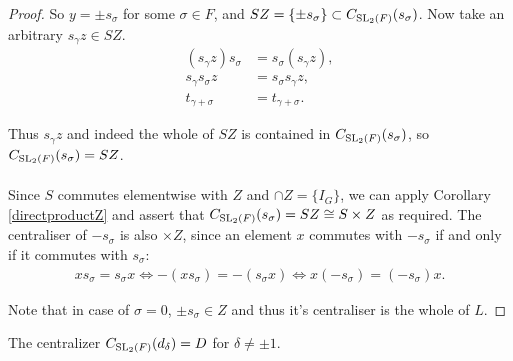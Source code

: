 \begin{proof}
    So $y = \pm s_\sigma$ for some $\sigma \in F$, and $SZ = \{ \pm s_\sigma \} \subset C_{\operatorname{SL}_2(F)}(s_\sigma)$. Now take an arbitrary $s_\gamma z \in SZ$.
    \begin{align*} (s_\gamma z) s_\sigma &= s_\sigma (s_\gamma z),
    \\ s_\gamma s_\sigma z &= s_\sigma s_\gamma z, \tag{since $z \in Z$}
    \\ t_{\gamma + \sigma} &= t_{\gamma + \sigma}.
    \end{align*}
    
    Thus $s_\gamma z$ and indeed the whole of $SZ$ is contained in $ C_{\operatorname{SL}_2(F)}(s_\sigma)$, so $C_{\operatorname{SL}_2(F)}(s_\sigma) = SZ$. \\
    \\
    Since $S$ commutes elementwise with $Z$ and $\cap Z = \{ I_G \}$, we can apply Corollary \ref{directproductZ} and assert that $C_{\operatorname{SL}_2(F)}(s_\sigma) = SZ \cong S \times Z$ as required. The centraliser of $- s_\sigma$ is also $\times Z$, since an element $x$ commutes with $- s_\sigma$ if and only if it commutes with $s_\sigma$:
    \begin{align*} 
        xs_\sigma = s_\sigma x \iff -(x s_\sigma) = - (s_\sigma x) \iff x(- s_\sigma) = (- s_\sigma)x.
    \end{align*}
    
    Note that in case of $\sigma = 0$, $\pm s_\sigma \in Z$ and thus it's centraliser is the whole of $L$.
    
    \end{proof}

    

    \begin{proposition}
        \label{centralizer_d_eq_D}
        \leanok

        The centralizer $C_{\operatorname{SL}_2(F)}(d_\delta) = D$ for $\delta \neq \pm 1$.
        \end{proposition}
        
